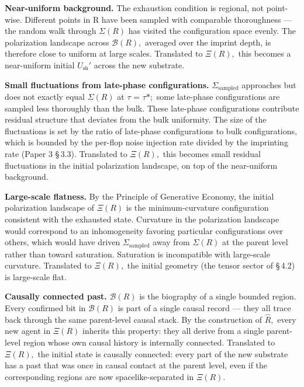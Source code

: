 \documentclass[11pt,oneside]{report}
\theoremstyle{definition}
\theoremstyle{remark}
\begin{document}
\textbf{Near-uniform background.} The exhaustion condition is regional,
not point-wise. Different points in R have been sampled with comparable
thoroughness --- the random walk through \ensuremath{\Sigma (R)} has visited the
configuration space evenly. The polarization landscape across \ensuremath{\mathcal{B}(R),}
averaged over the imprint depth, is therefore close to uniform at large
scales. Translated to \ensuremath{\Xi (R),} this becomes a near-uniform initial \ensuremath{U_{\mathrm{sh}}'}
across the new substrate.

\textbf{Small fluctuations from late-phase configurations.} \ensuremath{\Sigma_{\mathrm{sampled}}}
approaches but does not exactly equal \ensuremath{\Sigma (R)} at \ensuremath{\tau} = \ensuremath{\tau *;} some late-phase
configurations are sampled less thoroughly than the bulk. These
late-phase configurations contribute residual structure that deviates
from the bulk uniformity. The size of the fluctuations is set by the
ratio of late-phase configurations to bulk configurations, which is
bounded by the per-flop noise injection rate divided by the imprinting
rate (Paper 3 \S\,3.3). Translated to \ensuremath{\Xi (R),} this becomes small residual
fluctuations in the initial polarization landscape, on top of the
near-uniform background.

\textbf{Large-scale flatness.} By the Principle of Generative Economy,
the initial polarization landscape of \ensuremath{\Xi (R)} is the minimum-curvature
configuration consistent with the exhausted state. Curvature in the
polarization landscape would correspond to an inhomogeneity favoring
particular configurations over others, which would have driven
\ensuremath{\Sigma_{\mathrm{sampled}}} away from \ensuremath{\Sigma (R)} at the parent level rather than toward
saturation. Saturation is incompatible with large-scale curvature.
Translated to \ensuremath{\Xi (R),} the initial geometry (the tensor sector of \S\,4.2) is
large-scale flat.

\textbf{Causally connected past.} \ensuremath{\mathcal{B}(R)} is the biography of a single
bounded region. Every confirmed bit in \ensuremath{\mathcal{B}(R)} is part of a single causal
record --- they all trace back through the same parent-level causal
stack. By the construction of \ensuremath{\hat{R},} every new agent in \ensuremath{\Xi (R)} inherits this
property: they all derive from a single parent-level region whose own
causal history is internally connected. Translated to \ensuremath{\Xi (R),} the initial
state is causally connected: every part of the new substrate has a past
that was once in causal contact at the parent level, even if the
corresponding regions are now spacelike-separated in \ensuremath{\Xi (R).}
\end{document}
